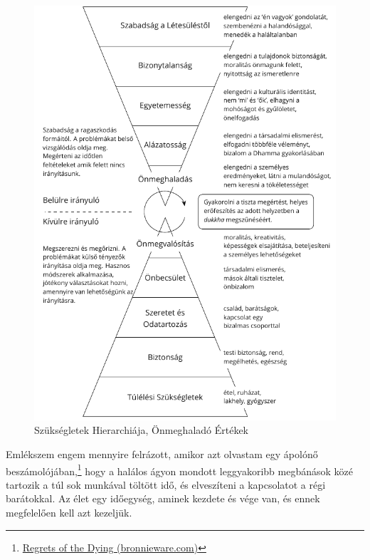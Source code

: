 \begin{figure}[h]
\vspace*{-15pt}
\caption{Szükségletek Hierarchiája, Önmeghaladó Értékek}\label{fig-self-transcendental}
\bigskip
\includegraphics[width=\linewidth]{./manuscript/tex/diagrams/self-transcendental-values-hu.pdf}
\end{figure}

\clearpage
\normalpagelayout

Emlékszem engem mennyire felrázott, amikor azt olvastam egy ápolónő
beszámolójában,\footnote{\href{https://bronnieware.com/blog/regrets-of-the-dying/}{Regrets
  of the Dying (bronnieware.com)}} hogy a halálos ágyon mondott
leggyakoribb megbánások közé tartozik a túl sok munkával töltött idő, és
elveszíteni a kapcsolatot a régi barátokkal. Az élet egy időegység,
aminek kezdete és vége van, és ennek megfelelően kell azt kezeljük.



